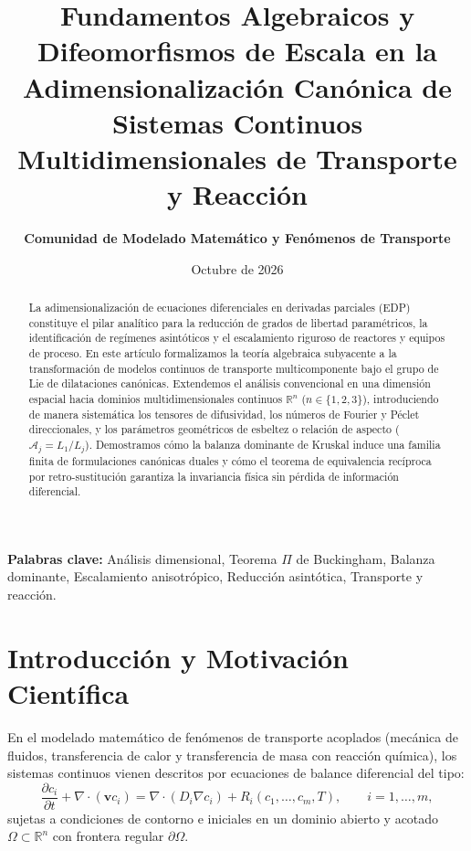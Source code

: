 \documentclass[11pt,a4paper]{article}
\title{\textbf{Fundamentos Algebraicos y Difeomorfismos de Escala en la Adimensionalización Canónica de Sistemas Continuos Multidimensionales de Transporte y Reacción}}
\author{\textbf{Comunidad de Modelado Matemático y Fenómenos de Transporte}}
\date{Octubre de 2026}
\begin{document}
\maketitle

\begin{abstract}
\noindent La adimensionalización de ecuaciones diferenciales en derivadas parciales (EDP) constituye el pilar analítico para la reducción de grados de libertad paramétricos, la identificación de regímenes asintóticos y el escalamiento riguroso de reactores y equipos de proceso. En este artículo formalizamos la teoría algebraica subyacente a la transformación de modelos continuos de transporte multicomponente bajo el grupo de Lie de dilataciones canónicas. Extendemos el análisis convencional en una dimensión espacial hacia dominios multidimensionales continuos $\mathbb{R}^n$ ($n \in \{1, 2, 3\}$), introduciendo de manera sistemática los tensores de difusividad, los números de Fourier y Péclet direccionales, y los parámetros geométricos de esbeltez o relación de aspecto ($\mathcal{A}_j = L_1/L_j$). Demostramos cómo la balanza dominante de Kruskal induce una familia finita de formulaciones canónicas duales y cómo el teorema de equivalencia recíproca por retro-sustitución garantiza la invariancia física sin pérdida de información diferencial.
\end{abstract}

\vspace{5mm}
\noindent\textbf{Palabras clave:} Análisis dimensional, Teorema $\Pi$ de Buckingham, Balanza dominante, Escalamiento anisotrópico, Reducción asintótica, Transporte y reacción.

\section{Introducción y Motivación Científica}
En el modelado matemático de fenómenos de transporte acoplados (mecánica de fluidos, transferencia de calor y transferencia de masa con reacción química), los sistemas continuos vienen descritos por ecuaciones de balance diferencial del tipo:
\begin{equation}
\frac{\partial c_i}{\partial t} + \nabla \cdot (\mathbf{v} c_i) = \nabla \cdot (D_i \nabla c_i) + R_i(c_1, \dots, c_m, T), \qquad i = 1, \dots, m,
\label{eq:balance_general}
\end{equation}
sujetas a condiciones de contorno e iniciales en un dominio abierto y acotado $\Omega \subset \mathbb{R}^n$ con frontera regular $\partial\Omega$. 
\end{document}
